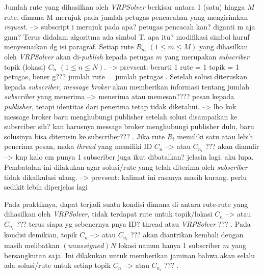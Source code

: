 Jumlah rute yang dihasilkan oleh \textit{VRPSolver} berkisar antara 1 (satu) hingga $M$ rute, dimana M merujuk pada jumlah petugas pencacahan yang mengirimkan \textit{request}. \color{red} --> subscript i merujuk pada apa? petugas pencacah kan? diganti m aja gmn? Terus didalam algoritma ada simbol T. apa itu? modifikasi simbol huruf menyesuaikan dg isi paragraf. \color{black} Setiap rute $R_m$ $(1 \leq m \leq M)$ yang dihasilkan oleh \textit{VRPSolver} akan di-\textit{publish} kepada petugas $m$ yang merupakan \textit{subscriber} topik (lokasi) $C_n$ $(1 \leq n \leq N)$. \color{red} --> prevsent: berarti 1 rute = 1 topik = 1 petugas, bener g??? jumlah rute = jumlah petugas \color{black}. Setelah solusi diteruskan kepada \textit{subscriber}, \textit{message broker} akan memberikan informasi tentang jumlah \textit{subscriber} yang menerima \color{red} --> menerima atau memesan???? \color{black} pesan kepada \textit{publisher}, tetapi identitas dari penerima tetap tidak diketahui. \color{red} --> lho kok message broker baru menghubungi publisher setelah solusi disampaikan ke subsrciber sih? kan harusnya message broker menghubungi publisher dulu, baru solusinya bisa diterusin ke subscriber??? \color{black}. Jika rute $R_i$ memiliki satu atau lebih penerima pesan, maka \textit{thread} yang memiliki ID $C_{n}$ \color{red} --> atau $C_{n_i}$ ??? \color{black} akan dianulir \color{red} --> knp kalo cm punya 1 subscriber juga ikut dibatalkan? jelasin lagi. aku lupa\color{black}. Pembatalan ini dilakukan agar solusi/rute yang telah diterima oleh \textit{subscriber} tidak dikalkulasi ulang. \color{red} --> prevsent: kalimat ini rasanya masih kurang. perlu sedikit lebih diperjelas lagi \color{black}


Pada praktiknya, dapat terjadi suatu kondisi dimana di antara rute-rute yang dihasilkan oleh \textit{VRPSolver}, tidak terdapat rute untuk topik/lokasi $C_{n}$ \color{red} --> atau $C_{n_i}$ ??? terus siapa yg sebenernya pnya ID? thread atau \textit{VRPSolver} ??? \color{black}. Pada kondisi demikian, topik $C_n$ \color{red} --> atau $C_{n_i}$ ??? \color{black} akan diantrikan kembali dengan masih melibatkan $(unassigned) N$ lokasi namun hanya 1 subscriber $m$ yang bersangkutan saja. Ini dilakukan untuk memberikan jaminan bahwa akan selalu ada solusi/rute untuk setiap topik $C_n$ \color{red} --> atau $C_{n_i}$ ??? \color{black}.



